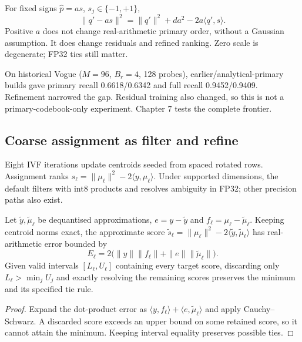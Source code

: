For fixed signs $\widehat p=a s$, $s_j\in\{-1,+1\}$,
\begin{equation}
 \|q'-a s\|^2=\|q'\|^2+da^2-2a\langle q',s\rangle.
 \label{eq:4-sign-ranking}
\end{equation}
Positive $a$ does not change real-arithmetic primary order, without a Gaussian assumption. It does change residuals and refined ranking. Zero scale is degenerate; FP32 ties still matter.

On historical Vogue ($M=96$, $B_r=4$, 128 probes), earlier/analytical-primary builds gave primary recall 0.6618/0.6342 and full recall 0.9452/0.9409. Refinement narrowed the gap. Residual training also changed, so this is not a primary-codebook-only experiment. Chapter 7 tests the complete frontier.

\subsection{Coarse assignment as filter and refine}

Eight IVF iterations update centroids seeded from spaced rotated rows. Assignment ranks $s_\ell=\|\mu_\ell\|^2-2\langle y,\mu_\ell\rangle$. Under supported dimensions, the default filters with int8 products and resolves ambiguity in FP32; other precision paths also exist.

\begin{resultblock}
\begin{lemma}
\label{lem:4-assignment-bound}
Let $\widetilde y,\widetilde\mu_\ell$ be dequantised approximations,
$e=y-\widetilde y$ and $f_\ell=\mu_\ell-\widetilde\mu_\ell$.
Keeping centroid norms exact, the approximate score
$\widetilde s_\ell=\|\mu_\ell\|^2-2\langle\widetilde y,\widetilde\mu_\ell\rangle$
has real-arithmetic error bounded by
\begin{equation}
 E_\ell=2\bigl(\|y\|\|f_\ell\|+\|e\|\|\widetilde\mu_\ell\|\bigr).
 \label{eq:4-assignment-bound}
\end{equation}
Given valid intervals $[L_\ell,U_\ell]$ containing every target score,
discarding only $L_\ell>\min_j U_j$ and exactly resolving the remaining
scores preserves the minimum and its specified tie rule.
\end{lemma}
\begin{proof}
Expand the dot-product error as
$\langle y,f_\ell\rangle+\langle e,\widetilde\mu_\ell\rangle$
and apply Cauchy--Schwarz. A discarded score exceeds an upper bound on
some retained score, so it cannot attain the minimum. Keeping interval
equality preserves possible ties.
\end{proof}
\end{resultblock}

